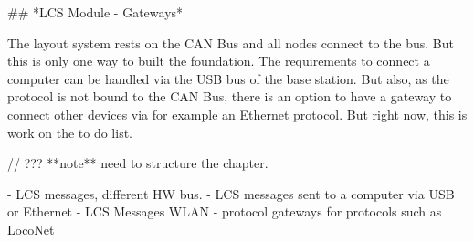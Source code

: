 ## *LCS Module - Gateways*

The layout system rests on the CAN Bus and all nodes connect to the bus. But this is only one way to built the foundation. The requirements to connect a computer can be handled via the USB bus of the base station. But also, as the protocol is not bound to the CAN Bus, there is an option to have a gateway to connect other devices via for example an Ethernet protocol. But right now, this is work on the to do list.

// ??? **note**  need to structure the chapter.

- LCS messages, different HW bus.
- LCS messages sent to a computer via USB or Ethernet
- LCS Messages WLAN
- protocol gateways for protocols such as LocoNet
